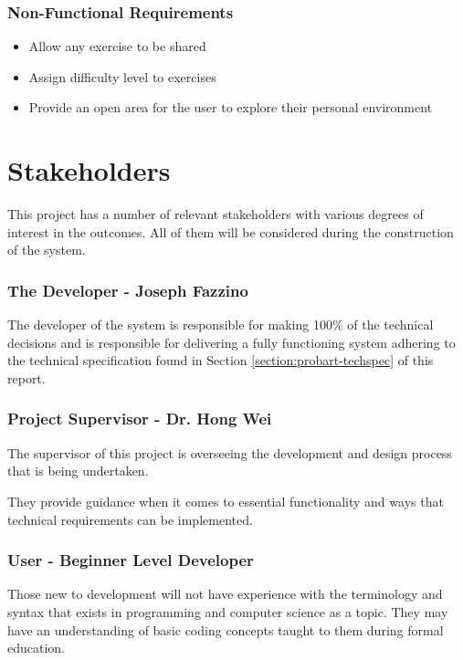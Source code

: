 \subsubsection{Non-Functional Requirements}
\begin{itemize}
    \setlength{\itemsep}{0em}
    \item Allow any exercise to be shared
    \item Assign difficulty level to exercises
    \item Provide an open area for the user to explore their personal environment
\end{itemize}

\section{Stakeholders} \label{section:probart-stake}
This project has a number of relevant stakeholders with various degrees of interest in the outcomes. All of them will be considered during the construction of the system.

\subsubsection{The Developer - Joseph Fazzino}
The developer of the system is responsible for making 100\% of the technical decisions and is responsible for delivering a fully functioning system adhering to the technical specification found in  Section \ref{section:probart-techspec} of this report.

\subsubsection{Project Supervisor - Dr. Hong Wei}
The supervisor of this project is overseeing the development and design process that is being undertaken. 

They provide guidance when it comes to essential functionality and ways that technical requirements can be implemented.

\subsubsection{User - Beginner Level Developer}
Those new to development will not have experience with the terminology and syntax that exists in programming and computer science as a topic. They may have an understanding of basic coding concepts taught to them during formal education.

